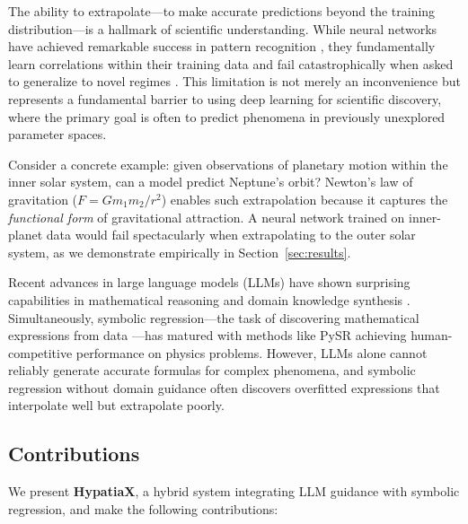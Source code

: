 \documentclass[twoside,11pt]{article}
\begin{document}
The ability to extrapolate---to make accurate predictions beyond the training distribution---is a hallmark of scientific understanding. While neural networks have achieved remarkable success in pattern recognition \citep{lecun2015deep}, they fundamentally learn correlations within their training data and fail catastrophically when asked to generalize to novel regimes \citep{lake2017building}. This limitation is not merely an inconvenience but represents a fundamental barrier to using deep learning for scientific discovery, where the primary goal is often to predict phenomena in previously unexplored parameter spaces.

Consider a concrete example: given observations of planetary motion within the inner solar system, can a model predict Neptune's orbit? Newton's law of gravitation ($F = Gm_1m_2/r^2$) enables such extrapolation because it captures the \emph{functional form} of gravitational attraction. A neural network trained on inner-planet data would fail spectacularly when extrapolating to the outer solar system, as we demonstrate empirically in Section~\ref{sec:results}.

Recent advances in large language models (LLMs) have shown surprising capabilities in mathematical reasoning and domain knowledge synthesis \citep{bubeck2023sparks}. Simultaneously, symbolic regression---the task of discovering mathematical expressions from data \citep{schmidt2009distilling}---has matured with methods like PySR \citep{cranmer2023pysr} achieving human-competitive performance on physics problems. However, LLMs alone cannot reliably generate accurate formulas for complex phenomena, and symbolic regression without domain guidance often discovers overfitted expressions that interpolate well but extrapolate poorly.

\subsection{Contributions}

We present \textbf{HypatiaX}, a hybrid system integrating LLM guidance with symbolic regression, and make the following contributions:
\end{document}
